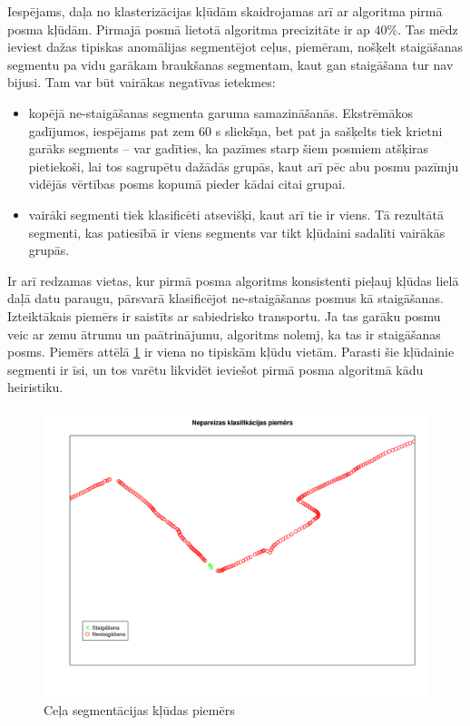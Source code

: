 \documentclass{ludis}
\begin{document}
Iespējams, daļa no klasterizācijas kļūdām skaidrojamas arī ar algoritma pirmā posma kļūdām. 
Pirmajā posmā lietotā algoritma precizitāte ir ap $40\%$. Tas mēdz ieviest dažas tipiskas anomālijas
segmentējot ceļus, piemēram, nošķelt staigāšanas segmentu pa vidu garākam braukšanas segmentam, kaut
gan staigāšana tur nav bijusi. Tam var būt vairākas negatīvas ietekmes:
\begin{itemize}
\item kopējā ne-staigāšanas segmenta garuma samazināšanās. Ekstrēmākos gadījumos, iespējams pat zem
  $60$ s sliekšņa, bet pat ja sašķelts tiek krietni garāks segments -- var gadīties, ka pazīmes
  starp šiem posmiem atšķiras pietiekoši, lai tos sagrupētu dažādās grupās, kaut arī pēc
  abu posmu pazīmju vidējās vērtības posms kopumā pieder kādai citai grupai.
\item vairāki segmenti tiek klasificēti atsevišķi, kaut arī tie ir viens. Tā rezultātā segmenti, kas
  patiesībā ir viens segments var tikt kļūdaini sadalīti vairākās grupās.
\end{itemize}

Ir arī redzamas vietas, kur pirmā posma algoritms konsistenti pieļauj kļūdas lielā daļā datu
paraugu, pārsvarā klasificējot ne-staigāšanas posmus kā staigāšanas. Izteiktākais piemērs ir 
saistīts ar sabiedrisko transportu. Ja tas garāku posmu veic ar zemu ātrumu un paātrinājumu,
algoritms nolemj, ka tas ir staigāšanas posms. Piemērs attēlā \ref{fig:wrong_segmentation} ir viena
no tipiskām kļūdu vietām. Parasti šie kļūdainie segmenti ir īsi, un tos varētu likvidēt ieviešot
pirmā posma algoritmā kādu heiristiku.

\begin{figure}
  \centering
  \includegraphics[scale=0.45]{img/wrong_segmentation}
  \caption{Ceļa segmentācijas kļūdas piemērs}
  \label{fig:wrong_segmentation}
\end{figure}
\end{document}
